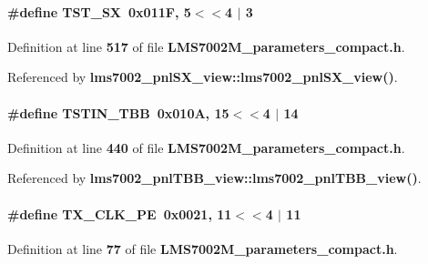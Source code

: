 \paragraph[{T\+S\+T\+\_\+\+SX}]{\setlength{\rightskip}{0pt plus 5cm}\#define T\+S\+T\+\_\+\+SX~0x011\+F, 5$<$$<$4 $\vert$  3}\label{LMS7002M__parameters__compact_8h_af29a43998fc49b1ae58eac235a1f0ee2}


Definition at line {\bf 517} of file {\bf L\+M\+S7002\+M\+\_\+parameters\+\_\+compact.\+h}.



Referenced by {\bf lms7002\+\_\+pnl\+S\+X\+\_\+view\+::lms7002\+\_\+pnl\+S\+X\+\_\+view()}.

\paragraph[{T\+S\+T\+I\+N\+\_\+\+T\+BB}]{\setlength{\rightskip}{0pt plus 5cm}\#define T\+S\+T\+I\+N\+\_\+\+T\+BB~0x010\+A, 15$<$$<$4 $\vert$  14}\label{LMS7002M__parameters__compact_8h_af573738d22073765ae5df804906f7b2e}


Definition at line {\bf 440} of file {\bf L\+M\+S7002\+M\+\_\+parameters\+\_\+compact.\+h}.



Referenced by {\bf lms7002\+\_\+pnl\+T\+B\+B\+\_\+view\+::lms7002\+\_\+pnl\+T\+B\+B\+\_\+view()}.

\paragraph[{T\+X\+\_\+\+C\+L\+K\+\_\+\+PE}]{\setlength{\rightskip}{0pt plus 5cm}\#define T\+X\+\_\+\+C\+L\+K\+\_\+\+PE~0x0021, 11$<$$<$4 $\vert$  11}\label{LMS7002M__parameters__compact_8h_a0fc1e7854a307ff28752f8c80addb343}


Definition at line {\bf 77} of file {\bf L\+M\+S7002\+M\+\_\+parameters\+\_\+compact.\+h}.



